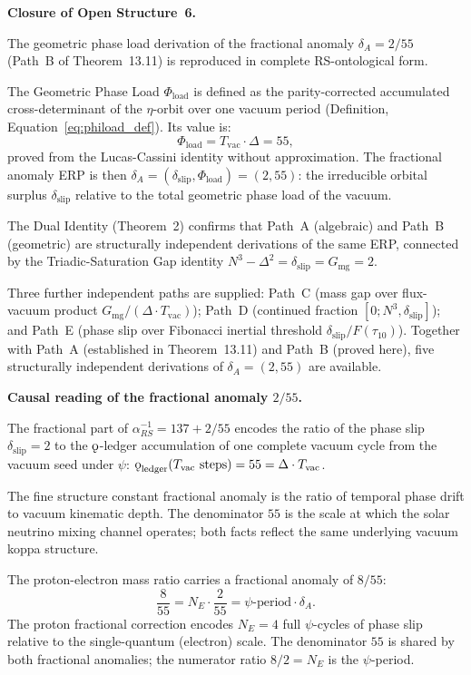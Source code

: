 \documentclass[11pt, letterpaper]{article}
\newcommand{\koppa}{\mathbin{\text{\rm\k{o}}}}
\theoremstyle{definition}
\theoremstyle{plain}
\begin{document}
\begin{rsbox}
\textbf{Closure of Open Structure~6.}

The geometric phase load derivation of the fractional anomaly $\delta_A = 2/55$
(Path~B of Theorem~13.11) is reproduced in complete RS-ontological form.

The Geometric Phase Load $\Phi_\mathrm{load}$ is defined as the
parity-corrected accumulated cross-determinant of the $\eta$-orbit over one vacuum
period (Definition, Equation~\eqref{eq:phiload_def}). Its value is:
\[
    \Phi_\mathrm{load} = T_\mathrm{vac} \cdot \Delta = 55,
\]
proved from the Lucas-Cassini identity without approximation. The fractional anomaly
ERP is then $\delta_A = (\delta_\mathrm{slip}, \Phi_\mathrm{load}) = (2, 55)$: the
irreducible orbital surplus $\delta_\mathrm{slip}$ relative to the total geometric
phase load of the vacuum.

The Dual Identity (Theorem~2) confirms that Path~A (algebraic) and Path~B
(geometric) are structurally independent derivations of the same ERP, connected by
the Triadic-Saturation Gap identity $N^3 - \Delta^2 = \delta_\mathrm{slip} = G_\mathrm{mg} = 2$.

Three further independent paths are supplied: Path~C (mass gap over flux-vacuum
product $G_\mathrm{mg}/(\Delta \cdot T_\mathrm{vac})$); Path~D (continued fraction
$[0; N^3, \delta_\mathrm{slip}]$); and Path~E (phase slip over Fibonacci inertial
threshold $\delta_\mathrm{slip}/F(\tau_{10})$). Together with Path~A (established in
Theorem~13.11) and Path~B (proved here), five structurally independent derivations of
$\delta_A = (2, 55)$ are available.

\end{rsbox}

\begin{observebox}
\textbf{Causal reading of the fractional anomaly $2/55$.}

The fractional part of $\alpha_{RS}^{-1} = 137 + 2/55$ encodes the ratio of
the phase slip $\delta_{\mathrm{slip}} = 2$ to the $\koppa$-ledger accumulation
of one complete vacuum cycle from the vacuum seed under $\psi$:
$\koppa_{\mathrm{ledger}}(T_{\mathrm{vac}}\text{ steps}) = 55
= \Delta \cdot T_{\mathrm{vac}}$.

The fine structure constant fractional anomaly is the ratio of temporal phase
drift to vacuum kinematic depth.  The denominator $55$ is the scale at which
the solar neutrino mixing channel operates; both facts reflect the same
underlying vacuum koppa structure.

The proton-electron mass ratio carries a fractional anomaly of $8/55$:
\[
\frac{8}{55} = N_E \cdot \frac{2}{55} = \psi\text{-period} \cdot \delta_A.
\]
The proton fractional correction encodes $N_E = 4$ full $\psi$-cycles of
phase slip relative to the single-quantum (electron) scale.  The denominator
$55$ is shared by both fractional anomalies; the numerator ratio
$8/2 = N_E$ is the $\psi$-period.
\end{observebox}
\newpage
\end{document}
